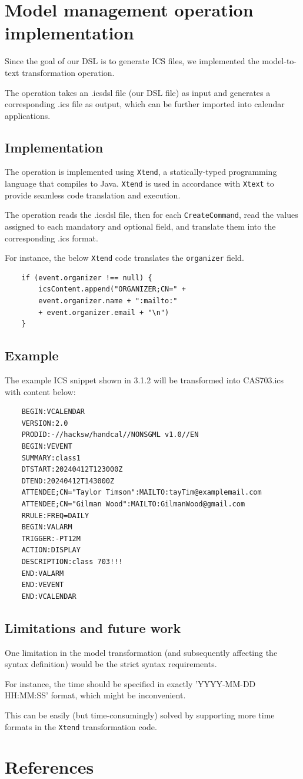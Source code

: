\documentclass[12pt, letterpaper, twoside]{article}
\begin{document}
\section{Model management operation implementation}
Since the goal of our DSL is to generate ICS files, we implemented the model-to-text transformation operation. 

The operation takes an .icsdsl file (our DSL file) as input and generates a corresponding .ics file as output, which can be further imported into calendar applications.

\subsection{Implementation}

The operation is implemented using \texttt{Xtend}, a statically-typed programming language that compiles to Java. 
\texttt{Xtend} is used in accordance with \texttt{Xtext} to provide seamless code translation and execution. 

The operation reads the .icsdsl file, then for each \texttt{CreateCommand}, read the values assigned to each mandatory and optional field, and translate them into the corresponding .ics format.

For instance, the below \texttt{Xtend} code translates the \texttt{organizer} field.
\begin{verbatim}
    if (event.organizer !== null) {
        icsContent.append("ORGANIZER;CN=" + 
        event.organizer.name + ":mailto:" 
        + event.organizer.email + "\n")
    }
\end{verbatim}

\subsection{Example}
The example ICS snippet shown in 3.1.2 will be transformed into CAS703.ics with content below:
\begin{verbatim}
    BEGIN:VCALENDAR
    VERSION:2.0
    PRODID:-//hacksw/handcal//NONSGML v1.0//EN
    BEGIN:VEVENT
    SUMMARY:class1
    DTSTART:20240412T123000Z
    DTEND:20240412T143000Z
    ATTENDEE;CN="Taylor Timson":MAILTO:tayTim@examplemail.com
    ATTENDEE;CN="Gilman Wood":MAILTO:GilmanWood@gmail.com
    RRULE:FREQ=DAILY
    BEGIN:VALARM
    TRIGGER:-PT12M
    ACTION:DISPLAY
    DESCRIPTION:class 703!!!
    END:VALARM
    END:VEVENT
    END:VCALENDAR
\end{verbatim}

\subsection{Limitations and future work}
One limitation in the model transformation (and subsequently affecting the syntax definition) would be the strict syntax requirements.  

For instance, the time should be specified in exactly 'YYYY-MM-DD HH:MM:SS' format, which might be inconvenient.

This can be easily (but time-consumingly) solved by supporting more time formats in the \texttt{Xtend} transformation code.





\newpage

\section{References}
\end{document}

